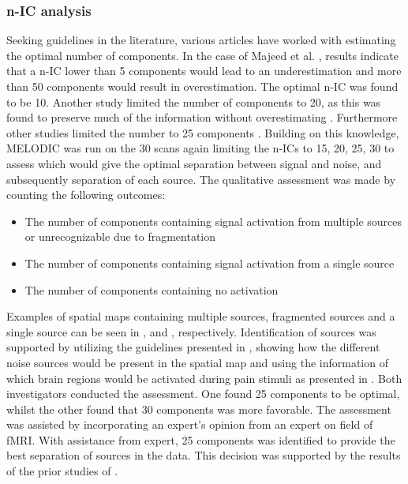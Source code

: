 \subsubsection{n-IC analysis}

Seeking guidelines in the literature, various articles have worked with estimating the optimal number of components. In the case of Majeed et al. \cite{Majeed2014}, results indicate that a n-IC lower than 5 components would lead to an underestimation and more than 50 components would result in overestimation. The optimal n-IC was found to be 10. Another study limited the number of components to 20, as this was found to preserve much of the information without overestimating \cite{Calhoun2001}. Furthermore other studies limited the number to 25 components \cite{Kim2013,Erpelding2013}. Building on this knowledge, MELODIC was run on the 30 scans again limiting the n-ICs to 15, 20, 25, 30 to assess which would give the optimal separation between signal and noise, and subsequently separation of each source. The qualitative assessment was made by counting the following outcomes: 
\begin{itemize}
	\item The number of components containing signal activation from multiple sources or unrecognizable due to fragmentation 
	\item The number of components containing signal activation from a single source 
	\item The number of components containing no activation    
\end{itemize}
 
Examples of spatial maps containing multiple sources, fragmented sources and a single source can be seen in ,  and , respectively. Identification of sources was supported by utilizing the guidelines presented in \cite{Griffanti2017}, showing how the different noise sources would be present in the spatial map and using the information of which brain regions would be activated during pain stimuli as presented in . Both investigators conducted the assessment. One found 25 components to be optimal, whilst the other found that 30 components was more favorable. The assessment was assisted by incorporating an expert's opinion from an expert on field of fMRI. With assistance from expert, 25 components was identified to provide the best separation of sources in the data. This decision was supported by the results of the prior studies of \cite{Kim2013,Erpelding2013}.     

